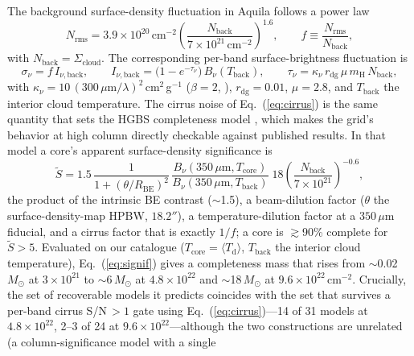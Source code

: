 \documentclass[11pt,a4paper]{article}
\newcommand{\msun}{M_{\odot}}
\newcommand{\Rbe}{R_{\mathrm{BE}}}
\newcommand{\Scloud}{\Sigma_{\mathrm{cloud}}}
\newcommand{\mH}{m_{\mathrm{H}}}
\begin{document}
The background surface-density fluctuation in Aquila follows a power law
\citep{Konyves+2015}
\begin{equation}
  N_{\mathrm{rms}} = 3.9\times10^{20}\,\mathrm{cm^{-2}}
  \left(\frac{N_{\mathrm{back}}}{7\times10^{21}\,\mathrm{cm^{-2}}}\right)^{1.6},
  \qquad f \equiv \frac{N_{\mathrm{rms}}}{N_{\mathrm{back}}},
  \label{eq:cirrus}
\end{equation}
with $N_{\mathrm{back}}=\Scloud$. The corresponding per-band surface-brightness
fluctuation is
\begin{equation}
  \sigma_\nu = f\,I_{\nu,\mathrm{back}}, \qquad
  I_{\nu,\mathrm{back}} = \bigl(1-e^{-\tau_\nu}\bigr)\,B_\nu(T_{\mathrm{back}}),
  \qquad
  \tau_\nu = \kappa_\nu\,r_{\mathrm{dg}}\,\mu\,\mH\,N_{\mathrm{back}},
  \label{eq:Iback}
\end{equation}
with $\kappa_\nu=10\,(300\,\mu\mathrm{m}/\lambda)^{2}$\,cm$^{2}$\,g$^{-1}$
($\beta=2$, \citealt{Konyves+2015}), $r_{\mathrm{dg}}=0.01$, $\mu=2.8$, and
$T_{\mathrm{back}}$ the interior cloud temperature. The cirrus noise of
Eq.~(\ref{eq:cirrus}) is the same quantity that sets the
HGBS completeness model \citep[][Appendix~B.2]{Konyves+2015}, which makes the
grid's behavior at high column directly checkable against published results.
In that model a core's apparent surface-density significance is
\begin{equation}
  \tilde S = 1.5\,
  \frac{1}{1+(\theta/\Rbe)^{2}}\,
  \frac{B_{\nu}(350\,\mu\mathrm{m},T_{\mathrm{core}})}{B_{\nu}(350\,\mu\mathrm{m},T_{\mathrm{back}})}\;
  18\left(\frac{N_{\mathrm{back}}}{7\times10^{21}}\right)^{-0.6},
  \label{eq:signif}
\end{equation}
the product of the intrinsic BE contrast ($\sim$1.5), a beam-dilution factor
($\theta$ the surface-density-map HPBW, $18.2''$), a temperature-dilution
factor at a $350\,\mu$m fiducial, and a cirrus factor that is exactly $1/f$;
a core is $\gtrsim$90\% complete for $\tilde S>5$. Evaluated on our catalogue
($T_{\mathrm{core}}=\langle T_{\mathrm d}\rangle$, $T_{\mathrm{back}}$ the
interior cloud temperature), Eq.~(\ref{eq:signif}) gives a completeness mass
that rises from $\sim$0.02\,$\msun$ at $3\times10^{21}$ to $\sim$6\,$\msun$ at
$4.8\times10^{22}$ and $\sim$18\,$\msun$ at $9.6\times10^{22}\,
\mathrm{cm^{-2}}$. Crucially, the set of recoverable models it predicts
coincides with the set that survives a per-band cirrus S/N\,${>}1$ gate
using Eq.~(\ref{eq:cirrus})---14 of 31 models at
$4.8\times10^{22}$, 2--3 of 24 at $9.6\times10^{22}$---although the two
constructions are unrelated (a column-significance model with a single
\end{document}
